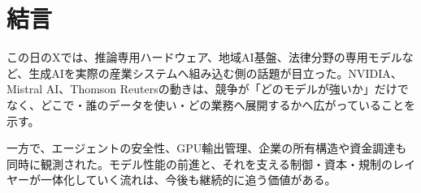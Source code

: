 \section*{結言}
この日のXでは、推論専用ハードウェア、地域AI基盤、法律分野の専用モデルなど、生成AIを実際の産業システムへ組み込む側の話題が目立った。NVIDIA、Mistral AI、Thomson Reutersの動きは、競争が「どのモデルが強いか」だけでなく、どこで・誰のデータを使い・どの業務へ展開するかへ広がっていることを示す。

一方で、エージェントの安全性、GPU輸出管理、企業の所有構造や資金調達も同時に観測された。モデル性能の前進と、それを支える制御・資本・規制のレイヤーが一体化していく流れは、今後も継続的に追う価値がある。

